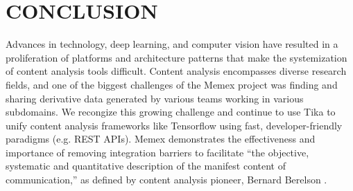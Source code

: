 \section{CONCLUSION} \label{sec:future}
Advances in technology, deep learning, and computer vision have resulted in a proliferation of platforms and architecture patterns that make the systemization of content analysis tools difficult. Content analysis encompasses diverse research fields, and one of the biggest challenges of the Memex project was finding and sharing derivative data generated by various teams working in various subdomains. We recongize this growing challenge and continue to use Tika to unify content analysis frameworks like Tensorflow using fast, developer-friendly paradigms (e.g. REST APIs).  Memex demonstrates the effectiveness and importance of removing integration barriers to facilitate ``the objective, systematic and quantitative description of the manifest content of communication,'' as defined by content analysis pioneer, Bernard Berelson \cite{berelson1952content}.  